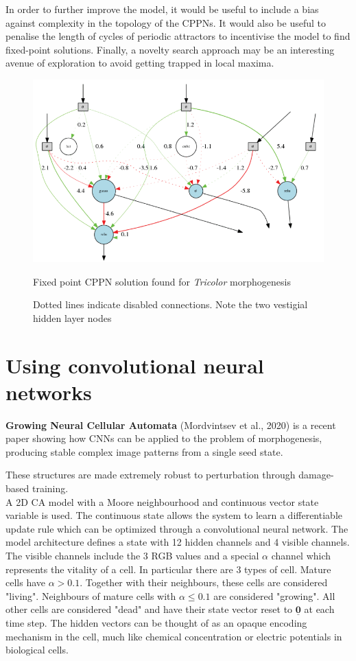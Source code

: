 In order to further improve the model, it would be useful to include a bias against complexity in the topology of the CPPNs.
It would also be useful to penalise the length of cycles of periodic attractors to incentivise the model to find fixed-point solutions.
Finally, a novelty search approach may be an interesting avenue of exploration to avoid getting trapped in local maxima.

\begin{figure}[!h]
    \centering
    \includegraphics[width=5in]{related_works/tricolor-cppn.png}
    \caption{Fixed point CPPN solution found for \textit{Tricolor} morphogenesis}
    \caption*{Dotted lines indicate disabled connections. Note the two vestigial hidden layer nodes}
    \label{fig:tricolor-cppn}
\end{figure}


\section{Using convolutional neural networks}

\noindent
\textbf{Growing Neural Cellular Automata} (Mordvintsev et al., 2020) \cite{mordvintsev2020growing} is a recent paper showing how CNNs can be applied to the problem of morphogenesis, producing stable complex image patterns from a single seed state.

These structures are made extremely robust to perturbation through damage-based training. \\

A 2D CA model with a Moore neighbourhood and continuous vector state variable is used.
The continuous state allows the system to learn a differentiable update rule which can be optimized through a convolutional neural network.
The model architecture defines a state with 12 hidden channels and 4 visible channels.
The visible channels include the 3 RGB values and a special $\alpha$ channel which represents the vitality of a cell.
In particular there are 3 types of cell.
Mature cells have $\alpha > 0.1$.
Together with their neighbours, these cells are considered "living".
Neighbours of mature cells with $\alpha \leq 0.1$ are considered "growing".
All other cells are considered "dead" and have their state vector reset to $\underline{\mathbf{0}}$ at each time step.
The hidden vectors can be thought of as an opaque encoding mechanism in the cell, much like chemical concentration or electric potentials in biological cells.\\

